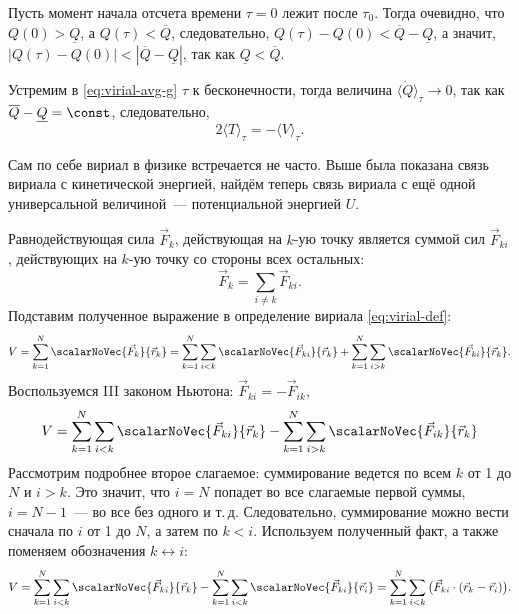 Пусть момент начала отсчета времени $\tau = 0$ лежит после $\tau_0$. Тогда очевидно, что $Q(0) > \underline Q$, а $Q(\tau) < \overline Q$, следовательно, $Q(\tau) - Q(0) < \overline Q - \underline Q$, а значит, $|Q(\tau) - Q(0)| < |\overline Q - \underline Q|$, так как $\underline Q < \overline Q$. 

Устремим в \eqref{eq:virial-avg-g} $\tau$ к бесконечности, тогда величина $\langle \dot{Q} \rangle_\tau  \to 0$, так как $\overline Q - \underline Q = \const$, следовательно,
\begin{equation}
    2\langle T \rangle_\tau = - \langle V \rangle_{\tau}.
    \label{eq:virial-t-v}
\end{equation}

Сам по себе вириал в физике встречается не часто. Выше была показана связь вириала с кинетической энергией, найдём теперь связь вириала с ещё одной универсальной величиной~---  потенциальной энергией $U$.\,\cite{virial-theorem}

Равнодействующая сила $\vec F_k$, действующая на $k$-ую точку является суммой сил $\vec F_{ki}$, действующих на $k$-ую точку со стороны всех остальных:
\begin{equation*}
    \vec F_k = \sum_{i \not= k} \vec F_{ki}.
\end{equation*}
Подставим полученное выражение в определение вириала \eqref{eq:virial-def}:
\begin{equation*}
    V = \sum_{k = 1}^N \scalarNoVec{\vec F_k}{\vec r_k}
    = \sum_{k = 1}^N \sum_{i < k} \scalarNoVec{\vec F_{ki}}{\vec r_k}
    + \sum_{k = 1}^N \sum_{i > k} \scalarNoVec{\vec F_{ki}}{\vec r_k}.
\end{equation*}
Воспользуемся III законом Ньютона: $\vec F_{ki} = - \vec F_{ik}$,
\begin{equation*}
    V = \sum_{k = 1}^N \sum_{i < k} \scalarNoVec{\vec F_{ki}}{\vec r_k}
    - \sum_{k = 1}^N \sum_{i > k} \scalarNoVec{\vec F_{ik}}{\vec r_k}
\end{equation*}
Рассмотрим подробнее второе слагаемое: суммирование ведется по всем $k$ от 1 до $N$ и $i > k$. Это значит, что $i = N$ попадет во все слагаемые первой суммы, $i = N - 1$~--- во все без одного и т.\,д. Следовательно, суммирование можно вести сначала по $i$ от 1 до $N$, а затем по $k < i$. Используем полученный факт, а также поменяем обозначения $k \leftrightarrow i$:
\begin{equation}
    V = \sum_{k = 1}^N \sum_{i < k} \scalarNoVec{\vec F_{ki}}{\vec r_k}
    - \sum_{k = 1}^N \sum_{i < k} \scalarNoVec{\vec F_{ki}}{\vec r_i}
    = \sum_{k = 1}^N \sum_{i < k} \big( \vec F_{ki} \cdot (\vec r_k - \vec r_i) \big).
    \label{eq:virial-v}
\end{equation}

